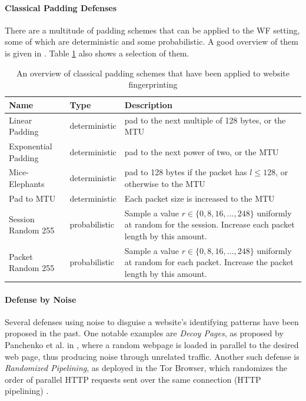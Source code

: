 \documentclass[
	ruledheaders=chapter,
	class=report,
	thesis={type=master, department=inf},
	accentcolor=1c,
	custommargins=true,
	marginpar=false,
	parskip=half-,
	fontsize=11pt,
]{tudapub}
\begin{document}
	\paragraph{Classical Padding Defenses} There are a multitude of padding schemes that can be applied to the WF setting, some of which are deterministic and some probabilistic. A good overview of them is given in \cite{Dyer2012}. Table \ref{tbl:padding} also shows a selection of them.
	
	\begin{table}
		\centering
		\small
		\begin{tabularx}{\textwidth}{llX}
			\toprule \textbf{Name} & \textbf{Type} & \textbf{Description} \\
			\midrule Linear Padding & deterministic & pad to the next multiple of 128 bytes, or the MTU \\
			Exponential Padding & deterministic & pad to the next power of two, or the MTU \\
			Mice-Elephants & deterministic & pad to 128 bytes if the packet has $l \leq 128$, or otherwise to the MTU \\
			Pad to MTU & deterministic & Each packet size is increased to the MTU \\ \addlinespace 
			Session Random 255 & probabilistic & Sample a value $r \in \{0, 8, 16, ..., 248\}$ uniformly at random for the session. Increase each packet length by this amount. \\
			Packet Random 255 & probabilistic & Sample a value $r \in \{0, 8, 16, ..., 248\}$ uniformly at random for each packet. Increase the packet length by this amount. \\
			\bottomrule
		\end{tabularx}
		\caption{An overview of classical padding schemes that have been applied to website fingerprinting \cite{Dyer2012}}
		\label{tbl:padding}
	\end{table}

	\paragraph{Defense by Noise} Several defenses using noise to disguise a website's identifying patterns have been proposed in the past. One notable examples are \textit{Decoy Pages}, as proposed by Panchenko et al. in \cite{Panchenko2011}, where a random webpage is loaded in parallel to the desired web page, thus producing noise through unrelated traffic. Another such defense is \textit{Randomized Pipelining}, as deployed in the Tor Browser, which randomizes the order of parallel HTTP requests sent over the same connection (HTTP pipelining) \cite{Perry2011,Cherubin2017}.
	
\end{document}

